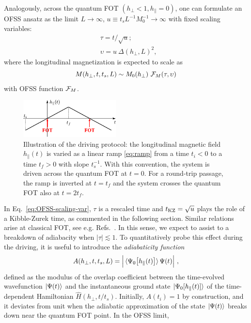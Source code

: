 Analogously, across the quantum FOT $(h_\perp<1,h_\parallel=0)$, one can formulate an OFSS ansatz as the limit  $L\to\infty$, $u\equiv  {t_s L^{-1} M_0^{-1}}\to \infty$ with fixed scaling variables:
\begin{align}\label{eq:OFSS-scaling-var}
&\tau=t/\sqrt{u};\\
\label{eq:OFSS-scaling-var2}
& \upsilon=u \ \Delta(h_\perp, L)^2 ,
\end{align}
where the longitudinal magnetization is expected to scale as
\begin{equation}\label{eq:OFSS-M}
M(h_\perp,t,t_s,L)\sim M_0(h_\perp) \  {\cal F}_M(\tau,\upsilon)
\end{equation}
with OFSS function ${\cal F}_M$. \\
\begin{figure}[t]
\centering
\includegraphics[width=0.45\textwidth]{imm/protocol.pdf}
\caption{Illustration of the driving protocol: the longitudinal magnetic field $h_\parallel(t)$ is varied as a linear ramp \eqref{eq:ramp} from a time $t_i<0$ to a time $t_f>0$ with slope $t_s^{-1}$. With this convention, the system is driven across the quantum FOT at $t=0$. For a round-trip passage, the ramp is inverted at $t=t_f$ and the system crosses the quantum FOT also at $t=2t_f$. }\label{fig:protocol}
\end{figure}
In Eq.~\eqref{eq:OFSS-scaling-var}, $\tau$ is a rescaled time and $t_{\rm KZ}=\sqrt{u}$ plays the role of a Kibble-Zurek time, as commented in the following section. Similar relations arise at classical FOT, see e.g. Refs.~\cite{pelissetto2016off,scopa2018dynamical}. In this sense, we expect to assist to a breakdown of adiabacity when $|\tau|\lesssim 1$. To quantitatively probe this effect during the driving, it is useful to introduce the {\it adiabaticity function}
\begin{equation}
	\label{eq:adiab}
	A(h_\perp,t,t_s,L) = \Big| \braket{\Psi_0\bigr[h_\parallel(t)\bigr]}{\Psi(t)} \Big| \,\,,
\end{equation}
defined as the modulus of the overlap coefficient between the time-evolved wavefunction $\ket{\Psi(t)}$ and the instantaneous ground state $\ket{\Psi_0[h_\parallel(t)]}$ of the time-dependent Hamiltonian $\hat{H}(h_\perp,t/t_s)$. Initially, $A(t_i)=1$ by construction, and it deviates from unit when the adiabatic approximation of the state $\ket{\Psi(t)}$ breaks down near the quantum FOT point. In the OFSS limit,
